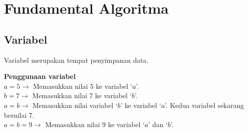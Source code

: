 \chapter{Fundamental Algoritma}\label{ch:app1}
\section{Variabel}
Variabel merupakan tempat penyimpanan data. 
\begin{contoh}
	\textbf{Penggunaan variabel}\\
	$a = 5 \rightarrow$ Memasukkan nilai 5 ke variabel `$a$'.\\
	$b = 7 \rightarrow$ Memasukkan nilai 7 ke variabel `$b$'.\\
	$a = b \rightarrow$ Memasukkan nilai variabel `$b$' ke variabel `$a$'. Kedua variabel sekarang bernilai 7.\\
	$a = b = 9 \rightarrow$ Memasukkan nilai 9 ke variabel `$a$' dan `$b$'.\\
\end{contoh}



\FloatBarrier
